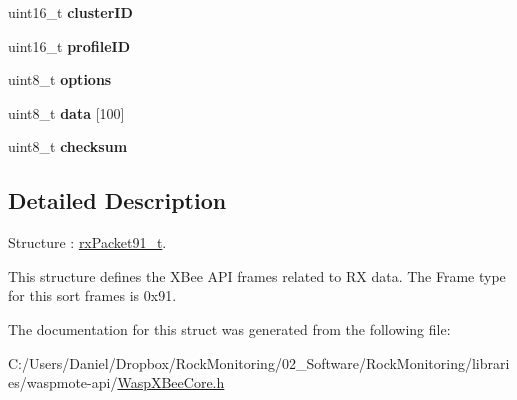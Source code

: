 \begin{DoxyCompactItemize}
\item 
uint16\+\_\+t {\bfseries cluster\+ID}\hypertarget{structrx_packet91__t_a654c0b375e5776bab838c28023099c9c}{}\label{structrx_packet91__t_a654c0b375e5776bab838c28023099c9c}

\item 
uint16\+\_\+t {\bfseries profile\+ID}\hypertarget{structrx_packet91__t_a360233bb9ed0b584f1ab9100fd1ef349}{}\label{structrx_packet91__t_a360233bb9ed0b584f1ab9100fd1ef349}

\item 
uint8\+\_\+t {\bfseries options}\hypertarget{structrx_packet91__t_a55c638bcffb317e5190cd7b083f1d026}{}\label{structrx_packet91__t_a55c638bcffb317e5190cd7b083f1d026}

\item 
uint8\+\_\+t {\bfseries data} \mbox{[}100\mbox{]}\hypertarget{structrx_packet91__t_a4b26950bdb8a19985ea3930dc1c06885}{}\label{structrx_packet91__t_a4b26950bdb8a19985ea3930dc1c06885}

\item 
uint8\+\_\+t {\bfseries checksum}\hypertarget{structrx_packet91__t_a0ef288ec70ca732da8b32dab3798ab51}{}\label{structrx_packet91__t_a0ef288ec70ca732da8b32dab3798ab51}

\end{DoxyCompactItemize}


\subsection{Detailed Description}
Structure \+: \hyperlink{structrx_packet91__t}{rx\+Packet91\+\_\+t}. 

This structure defines the X\+Bee A\+PI frames related to RX data. The Frame type for this sort frames is 0x91. 

The documentation for this struct was generated from the following file\+:\begin{DoxyCompactItemize}
\item 
C\+:/\+Users/\+Daniel/\+Dropbox/\+Rock\+Monitoring/02\+\_\+\+Software/\+Rock\+Monitoring/libraries/waspmote-\/api/\hyperlink{_wasp_x_bee_core_8h}{Wasp\+X\+Bee\+Core.\+h}\end{DoxyCompactItemize}
